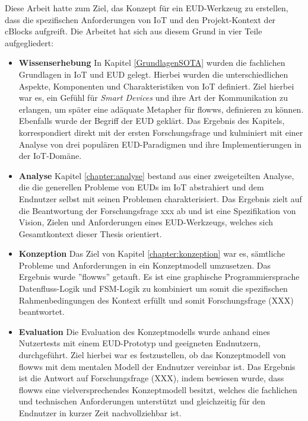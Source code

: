 Diese Arbeit hatte zum Ziel, das Konzept für ein \ac{EUD}-Werkzeug zu erstellen, dass die spezifischen Anforderungen von \ac{IoT} und den Projekt-Kontext der \acp{cBlock} aufgreift. Die Arbeitet hat sich aus diesem Grund in vier Teile aufgegliedert:

\begin{itemize}
    \item \textbf{Wissenserhebung} In Kapitel \ref{GrundlagenSOTA} wurden die fachlichen Grundlagen in \ac{IoT} und \ac{EUD} gelegt. Hierbei wurden die unterschiedlichen Aspekte, Komponenten und Charakteristiken von \ac{IoT} definiert. Ziel hierbei war es, ein Gefühl für \textit{Smart Devices} und ihre Art der Kommunikation zu erlangen, um später eine adäquate Metapher für flowws, definieren zu können. Ebenfalls wurde der Begriff der \ac{EUD} geklärt. Das Ergebnis des Kapitels, korrespondiert direkt mit der ersten Forschungsfrage und kulminiert mit einer Analyse von drei populären \ac{EUD}-Paradigmen und ihre Implementierungen in der \ac{IoT}-Domäne.
    \item \textbf{Analyse} Kapitel \ref{chapter:analyse} bestand aus einer zweigeteilten Analyse, die die generellen Probleme von \acp{EUD} im \ac{IoT} abstrahiert und dem Endnutzer selbst mit seinen Problemen charakterisiert. Das Ergebnis zielt auf die Beantwortung der Forschungsfrage xxx ab und ist eine Spezifikation von Vision, Zielen und Anforderungen eines \ac{EUD}-Werkzeugs, welches sich Gesamtkontext dieser Thesis orientiert.
    \item \textbf{Konzeption} Das Ziel von Kapitel \ref{chapter:konzeption} war es, sämtliche Probleme und Anforderungen in ein Konzeptmodell umzusetzen. Das Ergebnis wurde ''flowws'' getauft. Es ist eine graphische Programmiersprache Datenfluss-Logik und \ac{FSM}-Logik zu kombiniert um somit die spezifischen Rahmenbedingungen des Kontext erfüllt und somit Forschungsfrage (XXX) beantwortet.
    \item \textbf{Evaluation} Die Evaluation des Konzeptmodells wurde anhand eines Nutzertests mit einem \ac{EUD}-Prototyp und geeigneten Endnutzern, durchgeführt. Ziel hierbei war es festzustellen, ob das Konzeptmodell von flowws mit dem mentalen Modell der Endnutzer vereinbar ist. Das Ergebnis ist die Antwort auf Forschungsfrage (XXX), indem bewiesen wurde, dass flowws eine vielversprechendes Konzeptmodell besitzt, welches die fachlichen und technischen Anforderungen unterstützt und gleichzeitig für den Endnutzer in kurzer Zeit nachvollziehbar ist.
\end{itemize}

